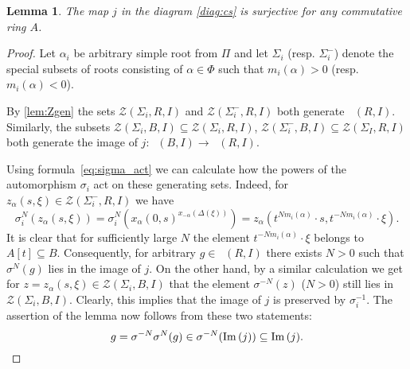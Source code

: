 \documentclass[oneside,12pt]{amsart}
\numberwithin{equation}{section}
\newtheorem{lem}{Lemma}
\numberwithin{lem}{section}
\theoremstyle{definition}
\theoremstyle{remark}
\DeclareMathOperator{\St}{St^G}
\DeclareMathOperator{\im}{Im\,}
\begin{document}
\begin{lem} The map $j$ in the diagram \eqref{diag:cs} is surjective for any commutative ring $A$. \end{lem}
\begin{proof}
 Let $\alpha_i$ be arbitrary simple root from $\Pi$ and let $\Sigma_i$ (resp. $\Sigma_i^-$) denote the special subsets of roots
 consisting of $\alpha \in \Phi$ such that $m_i(\alpha) > 0$ (resp. $m_i(\alpha) < 0$).

 By \cref{lem:Zgen} the sets $\mathcal{Z}(\Sigma_i, R, I)$ and $\mathcal{Z}(\Sigma_i^-, R, I)$ both generate $\St(R, I)$.
 Similarly, the subsets $\mathcal{Z}(\Sigma_i, B, I) \subseteq \mathcal{Z}(\Sigma_i, R, I)$,
                        $\mathcal{Z}(\Sigma_i^-, B, I) \subseteq \mathcal{Z}(\Sigma_I, R, I)$ both generate
                        the image of $j\colon \St(B, I) \to \St(R, I)$.

 Using formula~\eqref{eq:sigma_act} we can calculate how the powers of the automorphism $\sigma_i$ act on these generating sets.
 Indeed, for $z_\alpha(s, \xi) \in \mathcal{Z}(\Sigma_i^-, R, I)$ we have
 \[ \sigma_i^N (z_\alpha(s, \xi)) = \sigma_i^N (x_\alpha(0, s)^{x_{-\alpha}(\Delta(\xi))}) =
     z_\alpha(t^{N m_i(\alpha)} \cdot s, t^{-N m_i(\alpha)} \cdot \xi). \]
 It is clear that for sufficiently large $N$ the element $t^{-N m_i(\alpha)} \cdot \xi$ belongs to $A[t] \subseteq B$.
 Consequently, for arbitrary $g \in \St(R, I)$ there exists $N > 0$ such that $\sigma^N(g)$ lies in the image of $j$.
 On the other hand, by a similar calculation we get for $z=z_{\alpha}(s, \xi) \in \mathcal{Z}(\Sigma_i, B, I)$
 that the element $\sigma^{-N}(z)$ ($N > 0$) still lies in $\mathcal{Z}(\Sigma_i, B, I)$.
 Clearly, this implies that the image of $j$ is preserved by $\sigma_i^{-1}$.
 The assertion of the lemma now follows from these two statements:
 \[ g = \sigma^{-N} \sigma^N (g) \in \sigma^{-N}(\im(j)) \subseteq \im(j). \qedhere\] \end{proof}
\end{document}
